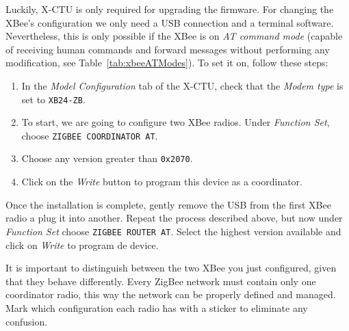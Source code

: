 Luckily, X-CTU is only required for upgrading the firmware. For changing the XBee's configuration we only need a USB connection and a terminal software. Nevertheless, this is only possible if the XBee is on \emph{AT command mode} (capable of receiving human commands and forward messages without performing any modification, see Table~\ref{tab:xbeeATModes}). To set it on, follow these steps:

\begin{enumerate}
	\item In the \emph{Model Configuration} tab of the X-CTU, check that the \emph{Modem type} is set to \texttt{XB24-ZB}.
	\item To start, we are going to configure two XBee radios. Under \emph{Function Set}, choose \texttt{ZIGBEE COORDINATOR AT}.
	\item Choose any version greater than \texttt{0x2070}.
	\item Click on the \emph{Write} button to program this device as a coordinator.
\end{enumerate}

Once the installation is complete, gently remove the USB from the first XBee radio a plug it into another. Repeat the process described above, but now under \emph{Function Set} choose \texttt{ZIGBEE ROUTER AT}. Select the highest version available and click on \emph{Write} to program de device.

It is important to distinguish between the two XBee you just configured, given that they behave differently. Every ZigBee network must contain only one coordinator radio, this way the network can be properly defined and managed. Mark which configuration each radio has with a sticker to eliminate any confusion.

\begin{table}[htbp]
	\centering
	\caption{XBee AT modes}
	\label{tab:xbeeATModes}
\end{table}

